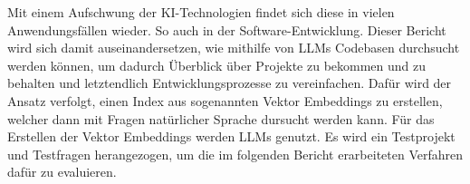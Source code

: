 \documentclass[../main.tex]{subfiles}
\begin{document}
Mit einem Aufschwung der KI-Technologien findet sich diese in vielen Anwendungsfällen wieder.
So auch in der Software-Entwicklung.
Dieser Bericht wird sich damit auseinandersetzen, wie mithilfe von \glspl{LLM} Codebasen durchsucht werden können, um dadurch Überblick über Projekte zu bekommen und zu behalten und letztendlich Entwicklungsprozesse zu vereinfachen.
Dafür wird der Ansatz verfolgt, einen Index aus sogenannten Vektor Embeddings zu erstellen, welcher dann mit Fragen natürlicher Sprache dursucht werden kann.
Für das Erstellen der Vektor Embeddings werden \glspl{LLM} genutzt.
Es wird ein Testprojekt und Testfragen herangezogen, um die im folgenden Bericht erarbeiteten Verfahren dafür zu evaluieren.
\end{document}
